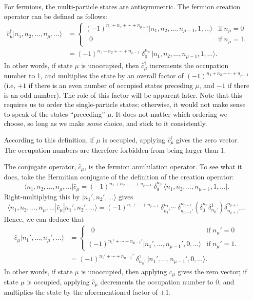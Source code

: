 \documentclass[pra,12pt]{revtex4}
\begin{document}
For fermions, the multi-particle states are antisymmetric.  The
fermion creation operator can be defined as follows:
$$\begin{aligned}\hat{c}_\mu^\dagger |n_1, n_2, \dots, n_\mu,\dots\rangle &= \begin{cases}(-1)^{n_1 + n_2 + \cdots + n_{\mu-1}} |n_1, n_2, \dots, n_{\mu-1}, 1, \dots\rangle & \mathrm{if} \; n_\mu = 0 \\ \;\;0 & \mathrm{if}\; n_\mu = 1.
\end{cases} \\&= (-1)^{n_1 + n_2 + \cdots + n_{\mu-1}}\; \delta^{n_\mu}_0\, \big|n_1, n_2, \dots, n_{\mu-1}, 1, \dots\big\rangle. \end{aligned}$$
In other words, if state $\mu$ is unoccupied, then
$\hat{c}_\mu^\dagger$ increments the occupation number to 1, and
multiplies the state by an overall factor of $(-1)^{n_1 + n_2 + \cdots
  + n_{\mu-1}}$ (i.e, $+1$ if there is an even number of occupied
states preceding $\mu$, and $-1$ if there is an odd number).  The role
of this factor will be apparent later.  Note that this requires us to
order the single-particle states; otherwise, it would not make sense
to speak of the states ``preceding'' $\mu$.  It does not matter which
ordering we choose, so long as we make \textit{some} choice, and stick
to it consistently.

According to this definition, if $\mu$ is occupied, applying
$\hat{c}_\mu^\dagger$ gives the zero vector.  The occupation numbers
are therefore forbidden from being larger than 1.

The conjugate operator, $\hat{c}_\mu$, is the fermion annihilation
operator.  To see what it does, take the Hermitian conjugate of the
definition of the creation operator:
$$\langle n_1, n_2, \dots, n_\mu,\dots| \hat{c}_\mu  =
(-1)^{n_1 + n_2 + \cdots + n_{\mu-1}}\; \delta^{n_\mu}_0\, \big\langle n_1, n_2, \dots, n_{\mu-1}, 1, \dots\big|.$$
Right-multiplying this by $|n_1',n_2',\dots\rangle$ gives
$$\langle n_1, n_2, \dots, n_\mu,\dots| \hat{c}_\mu |n_1', n_2', \dots\rangle  = (-1)^{n_1 + \cdots + n_{\mu-1}} \;\delta^{n_1}_{n_1'} \cdots \;\delta^{n_{\mu-1}}_{n_{\mu-1}'} \left(\delta^{n_\mu}_0 \delta^1_{n_\mu'} \right) \delta^{n_{\mu+1}}_{n_{\mu+1}'} \dots$$
Hence, we can deduce that
$$\begin{aligned}\hat{c}_\mu |n_1', \dots, n_\mu',\dots\rangle &= \begin{cases} \;\;0 & \mathrm{if}\; n_\mu' = 0 \\ (-1)^{n_1' + \cdots + n_{\mu-1}'} |n_1', \dots, n_{\mu-1}', 0, \dots\rangle & \mathrm{if} \; n_\mu' = 1. \end{cases} \\ &= (-1)^{n_1' + \cdots + n_{\mu-1}'} \; \delta^1_{n_\mu'} \, \big|n_1', \dots, n_{\mu-1}', 0, \dots\big\rangle.\end{aligned}$$
In other words, if state $\mu$ is unoccupied, then applying
$\hat{c}_\mu$ gives the zero vector; if state $\mu$ is occupied,
applying $\hat{c}_\mu$ decrements the occupation number to $0$, and
multiplies the state by the aforementioned factor of $\pm 1$.
\end{document}
